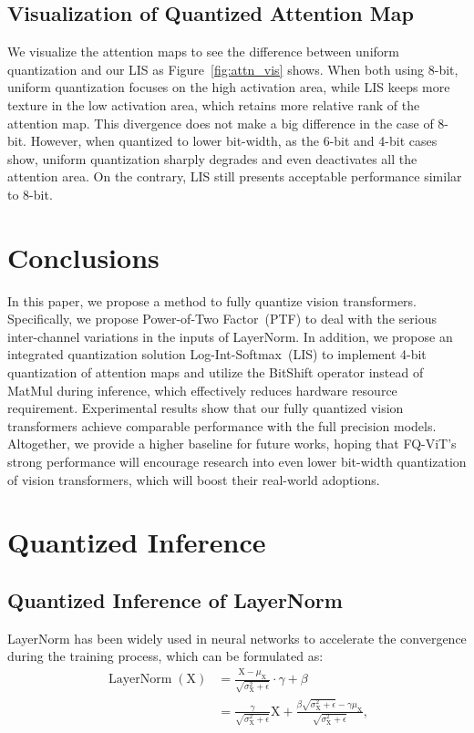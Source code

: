 \documentclass{article}
\begin{document}
\subsection{Visualization of Quantized Attention Map}
We visualize the attention maps to see the difference between uniform quantization and our LIS as Figure~\ref{fig:attn_vis} shows. When both using 8-bit, uniform quantization focuses on the high activation area, while LIS keeps more texture in the low activation area, which retains more relative rank of the attention map. This divergence does not make a big difference in the case of 8-bit. However, when quantized to lower bit-width, as the 6-bit and 4-bit cases show, uniform quantization sharply degrades and even deactivates all the attention area. On the contrary, LIS still presents acceptable performance similar to 8-bit.

\section{Conclusions}
In this paper, we propose a method to fully quantize vision transformers. Specifically, we propose Power-of-Two Factor~(PTF) to deal with the serious inter-channel variations in the inputs of LayerNorm. In addition, we propose an integrated quantization solution Log-Int-Softmax~(LIS) to implement 4-bit quantization of attention maps and utilize the BitShift operator instead of MatMul during inference, which effectively reduces hardware resource requirement. 
Experimental results show that our fully quantized vision transformers achieve comparable performance with the full precision models.
Altogether, we provide a higher baseline for future works, hoping that FQ-ViT’s strong performance will encourage research into even lower bit-width quantization of vision transformers, which will boost their real-world adoptions.

\clearpage
\newpage
\small{
}

\newpage
\appendix
\section{Quantized Inference}
\subsection{Quantized Inference of LayerNorm}
LayerNorm has been widely used in neural networks to accelerate the convergence during the training process, which can be formulated as:
\begin{align}
    \label{ln}
     \operatorname{LayerNorm}(\textrm{X}) &= \frac{\textrm{X}-\mu_\textrm{X}}{\sqrt{\sigma_\textrm{X}^2+\epsilon}}\cdot\gamma + \beta\\
    &=\frac{\gamma}{\sqrt{\sigma_\textrm{X}^2+\epsilon}}\textrm{X} + \frac{\beta\sqrt{\sigma_\textrm{X}^2+\epsilon} - \gamma\mu_\textrm{X}}{\sqrt{\sigma_\textrm{X}^2+\epsilon}},
\end{align}
\end{document}
